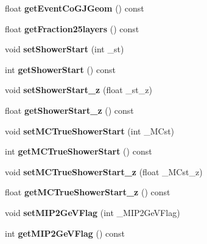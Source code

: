 \begin{DoxyCompactItemize}
\item 
float {\bfseries get\-Event\-Co\-G\-J\-Geom} () const \label{classCALICE_1_1EventVariables_a9041f5037b9da56abfdf55ab22f61927}

\item 
float {\bfseries get\-Fraction25layers} () const \label{classCALICE_1_1EventVariables_a6150acd33b34da1f59713214fbc443ce}

\item 
void {\bfseries set\-Shower\-Start} (int \-\_\-st)\label{classCALICE_1_1EventVariables_ad4eba682593f6039fdf214228ec4d180}

\item 
int {\bfseries get\-Shower\-Start} () const \label{classCALICE_1_1EventVariables_ae6a9d5544b4e480629a8713bf0074c26}

\item 
void {\bfseries set\-Shower\-Start\-\_\-z} (float \-\_\-st\-\_\-z)\label{classCALICE_1_1EventVariables_a7a058fa14361fef92b0f2a19a46dcb97}

\item 
float {\bfseries get\-Shower\-Start\-\_\-z} () const \label{classCALICE_1_1EventVariables_ab863f015d8f23a2108d8baf122938a96}

\item 
void {\bfseries set\-M\-C\-True\-Shower\-Start} (int \-\_\-\-M\-Cst)\label{classCALICE_1_1EventVariables_a1304956942e6f6bd45946450831705d8}

\item 
int {\bfseries get\-M\-C\-True\-Shower\-Start} () const \label{classCALICE_1_1EventVariables_a48c75755d417c8b378c6c3b6f8419be0}

\item 
void {\bfseries set\-M\-C\-True\-Shower\-Start\-\_\-z} (float \-\_\-\-M\-Cst\-\_\-z)\label{classCALICE_1_1EventVariables_a82f6939cf6cc4978724c98ad683b2af0}

\item 
float {\bfseries get\-M\-C\-True\-Shower\-Start\-\_\-z} () const \label{classCALICE_1_1EventVariables_a1f9162383468022b66da29ba7d416994}

\item 
void {\bfseries set\-M\-I\-P2\-Ge\-V\-Flag} (int \-\_\-\-M\-I\-P2\-Ge\-V\-Flag)\label{classCALICE_1_1EventVariables_a9faad78c55179e421c3ec5454fa4869e}

\item 
int {\bfseries get\-M\-I\-P2\-Ge\-V\-Flag} () const \label{classCALICE_1_1EventVariables_a4788466a0ed2e7b3c1be0becc989004b}


\end{DoxyCompactItemize}
